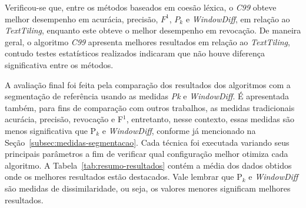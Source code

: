 Verificou-se que, entre os métodos baseados em coesão léxica, o \textit{C99} obteve melhor desempenho em acurácia, precisão, $F^1$, $P_k$ e \textit{WindowDiff}, em relação ao \textit{TextTiling}, enquanto este obteve o melhor desempenho em revocação. De maneira geral, o algoritmo \textit{C99} apresenta melhores resultados em relação ao \textit{TextTiling}, contudo testes estatísticos realizados indicaram que não houve diferença significativa entre os métodos. 











A avaliação final foi feita pela comparação dos resultados dos algoritmos com a segmentação de referência usando as medidas \textit{Pk} e \textit{WindowDiff}. É apresentada também, para fins de comparação com outros trabalhos, as medidas tradicionais acurácia, precisão, revocação e F$^1$, entretanto, nesse contexto, essas medidas são menos significativa que P$_k$ e \textit{WindowDiff}, conforme já mencionado na Seção~\ref{subsec:medidas-segmentacao}. 
Cada técnica foi executada variando seus principais parâmetros a fim de verificar qual configuração melhor otimiza cada algoritmo. A Tabela~\ref{tab:resumo-resultados} contém a média dos dados obtidos onde os melhores resultados estão destacados. Vale lembrar que P$_k$ e \textit{WindowDiff} são medidas de dissimilaridade, ou seja, os valores menores significam melhores resultados.


